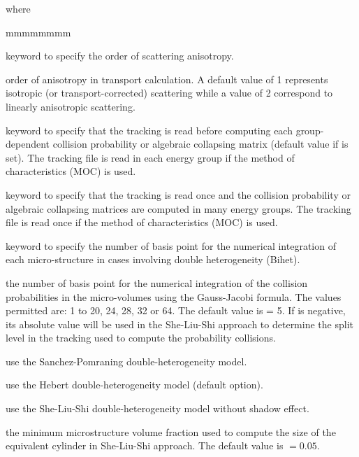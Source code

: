 \noindent
where

\begin{ListeDeDescription}{mmmmmmmm}

\item[\moc{ANIS}] keyword to specify the order of scattering anisotropy. 

\item[\dusa{nanis}] order of anisotropy in transport calculation.
A default value of 1 represents isotropic (or transport-corrected) scattering while a value of 2
correspond to linearly anisotropic scattering.

\item[\moc{ONEG}] keyword to specify that the tracking is read before computing each group-dependent collision
probability or algebraic collapsing matrix (default value if  is set). The tracking file is
read in each energy group if the method of characteristics (MOC) is used.

\item[\moc{ALLG}] keyword to specify that the tracking is read once and the collision
probability or algebraic collapsing matrices are computed in many energy groups.  The tracking file is
read once if the method of characteristics (MOC) is used.
 
\item[\moc{QUAB}] keyword to specify the number of basis point for the
numerical integration of each micro-structure in cases involving double
heterogeneity (Bihet).

\item[\dusa{iquab}] the number of basis point for the numerical integration of
the collision probabilities in the micro-volumes using the Gauss-Jacobi
formula. The values permitted are: 1 to 20, 24, 28, 32 or 64. The default value
is  = 5. If  is negative, its absolute value will be used in the She-Liu-Shi approach to determine the
split level in the tracking used to compute the probability collisions.

\item[\moc{SAPO}] use the Sanchez-Pomraning double-heterogeneity model.\cite{sapo}

\item[\moc{HEBE}] use the Hebert double-heterogeneity model (default option).\cite{BIHET}

\item[\moc{SLSI}] use the She-Liu-Shi double-heterogeneity model without shadow effect.\cite{She2017}

\item[\dusa{frtm}] the minimum microstructure volume fraction used to compute the size of the equivalent cylinder in She-Liu-Shi approach. The default value is  $=0.05$.


\end{ListeDeDescription}
